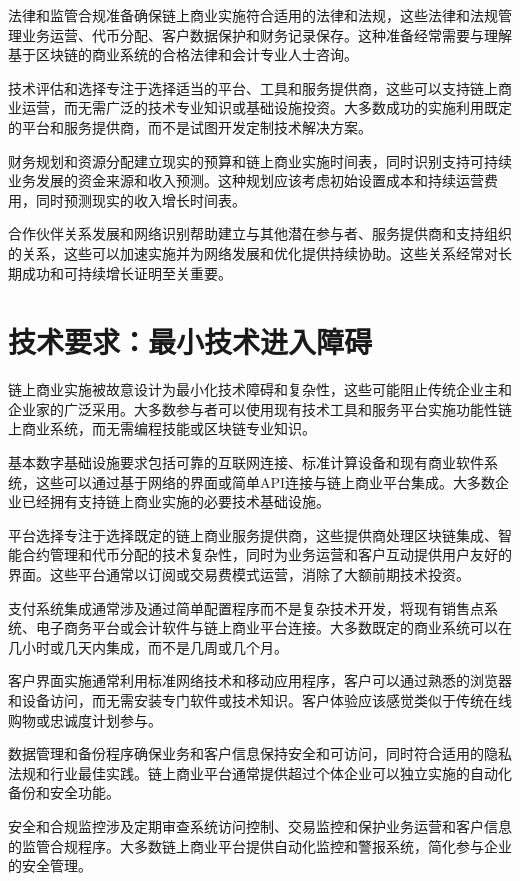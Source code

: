 \documentclass[
  Letterpaper,
]{scrbook}
\begin{document}
法律和监管合规准备确保链上商业实施符合适用的法律和法规，这些法律和法规管理业务运营、代币分配、客户数据保护和财务记录保存。这种准备经常需要与理解基于区块链的商业系统的合格法律和会计专业人士咨询。

技术评估和选择专注于选择适当的平台、工具和服务提供商，这些可以支持链上商业运营，而无需广泛的技术专业知识或基础设施投资。大多数成功的实施利用既定的平台和服务提供商，而不是试图开发定制技术解决方案。

财务规划和资源分配建立现实的预算和链上商业实施时间表，同时识别支持可持续业务发展的资金来源和收入预测。这种规划应该考虑初始设置成本和持续运营费用，同时预测现实的收入增长时间表。

合作伙伴关系发展和网络识别帮助建立与其他潜在参与者、服务提供商和支持组织的关系，这些可以加速实施并为网络发展和优化提供持续协助。这些关系经常对长期成功和可持续增长证明至关重要。

\section{技术要求：最小技术进入障碍}\label{ux6280ux672fux8981ux6c42ux6700ux5c0fux6280ux672fux8fdbux5165ux969cux788d}

链上商业实施被故意设计为最小化技术障碍和复杂性，这些可能阻止传统企业主和企业家的广泛采用。大多数参与者可以使用现有技术工具和服务平台实施功能性链上商业系统，而无需编程技能或区块链专业知识。

基本数字基础设施要求包括可靠的互联网连接、标准计算设备和现有商业软件系统，这些可以通过基于网络的界面或简单API连接与链上商业平台集成。大多数企业已经拥有支持链上商业实施的必要技术基础设施。

平台选择专注于选择既定的链上商业服务提供商，这些提供商处理区块链集成、智能合约管理和代币分配的技术复杂性，同时为业务运营和客户互动提供用户友好的界面。这些平台通常以订阅或交易费模式运营，消除了大额前期技术投资。

支付系统集成通常涉及通过简单配置程序而不是复杂技术开发，将现有销售点系统、电子商务平台或会计软件与链上商业平台连接。大多数既定的商业系统可以在几小时或几天内集成，而不是几周或几个月。

客户界面实施通常利用标准网络技术和移动应用程序，客户可以通过熟悉的浏览器和设备访问，而无需安装专门软件或技术知识。客户体验应该感觉类似于传统在线购物或忠诚度计划参与。

数据管理和备份程序确保业务和客户信息保持安全和可访问，同时符合适用的隐私法规和行业最佳实践。链上商业平台通常提供超过个体企业可以独立实施的自动化备份和安全功能。

安全和合规监控涉及定期审查系统访问控制、交易监控和保护业务运营和客户信息的监管合规程序。大多数链上商业平台提供自动化监控和警报系统，简化参与企业的安全管理。
\end{document}
